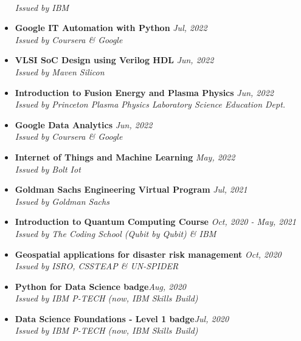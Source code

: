 \documentclass[12pt]{my_cv}
\begin{document}
\begin{itemize}
\\ \textit{Issued by IBM}
\item \textbf{Google IT Automation with Python} \hfill \textit{Jul, 2022}
\\ \textit{Issued by Coursera \& Google}
\item \textbf{VLSI SoC Design using Verilog HDL} \hfill \textit{Jun, 2022}
\\ \textit{Issued by Maven Silicon }
\item \textbf{Introduction to Fusion Energy and Plasma Physics}  \hfill \textit{Jun, 2022}
\\ \textit{Issued by Princeton Plasma Physics Laboratory Science Education Dept.}
\item \textbf{Google Data Analytics} \hfill \textit{Jun, 2022}
\\ \textit{Issued by Coursera \& Google}
\item \textbf{Internet of Things and Machine Learning} \hfill \textit{May, 2022}
\\ \textit{Issued by Bolt Iot}
\item \textbf{Goldman Sachs Engineering Virtual Program} \hfill \textit{Jul, 2021}
\\ \textit{Issued by Goldman Sachs} 
\item \textbf{Introduction to Quantum Computing Course } \hfill \textit{Oct, 2020 - May, 2021}
\\ \textit{Issued by The Coding School (Qubit by Qubit) \& IBM}
\item\textbf{ Geospatial applications for disaster risk management } \hfill \textit{Oct, 2020}
\\ \textit{Issued by ISRO, CSSTEAP \& UN-SPIDER}
\item \textbf{Python for Data Science badge}\hfill \textit{Aug, 2020}
\\ \textit{Issued by IBM P-TECH (now, IBM Skills Build)}
\item \textbf{Data Science Foundations - Level 1 badge}\hfill \textit{Jul, 2020}
\\ \textit{Issued by IBM P-TECH (now, IBM Skills Build)}

\end{itemize}
\end{document}
